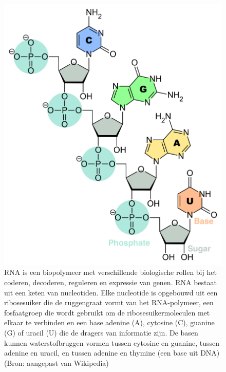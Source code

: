 \documentclass[
  11pt,
]{book}
\begin{document}
\begin{figure}

{\centering \includegraphics[width=0.5\linewidth]{./figs/RNA-Nucleobases} 

}

\caption{RNA is een biopolymeer met verschillende biologische rollen bij het coderen, decoderen, reguleren en expressie van genen. RNA bestaat uit een keten van nucleotiden. Elke nucleotide is opgebouwd uit een ribosesuiker die de ruggengraat vormt van het RNA-polymeer, een fosfaatgroep die wordt gebruikt om de ribosesuikermoleculen met elkaar te verbinden en een base adenine (A), cytosine (C), guanine (G) of uracil (U) die de dragers van informatie zijn. De basen kunnen waterstofbruggen vormen tussen cytosine en guanine, tussen adenine en uracil, en tussen adenine en thymine (een base uit DNA) (Bron: aangepast van Wikipedia)}\label{fig:RNA}
\end{figure}
\end{document}
